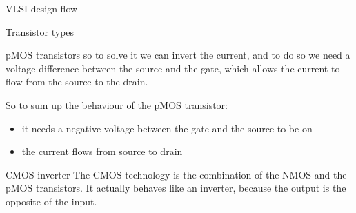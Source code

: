 \begin{section}{VLSI design flow}
\begin{subsection}{Transistor types}
\begin{subsubsection}{pMOS transistors}
      so to solve it we can invert the current, and to do so we need a voltage difference between the
      source and the gate, which allows the current to flow from the source to the drain.
      \begin{boxH}
        So to sum up the behaviour of the pMOS transistor:
        \begin{itemize}
          \item it needs a negative voltage between the gate and the source to be on
          \item the current flows from source to drain
        \end{itemize}
      \end{boxH}
    \end{subsubsection}
    \begin{subsubsection}{CMOS inverter}
      The CMOS technology is the combination of the NMOS and the pMOS transistors. It actually behaves
      like an inverter, because the output is the opposite of the input.\\


\end{subsubsection}
\end{subsection}
\end{section}
